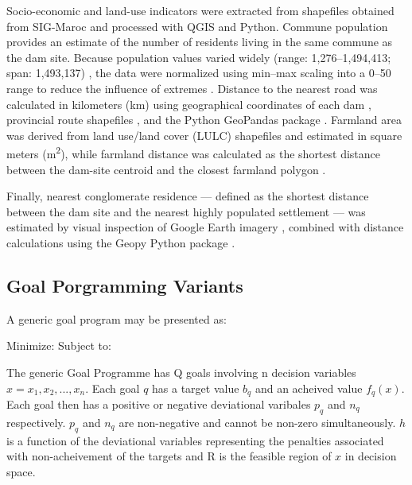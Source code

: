 Socio-economic and land-use indicators were extracted from shapefiles obtained from SIG-Maroc \cite{SIG_Maroc_Shapefiles} and processed with QGIS and Python. Commune population provides an estimate of the number of residents living in the same commune as the dam site. Because population values varied widely (range: 1,276–1,494,413; span: 1,493,137) \cite{Ersoy2022}, the data were normalized using min–max scaling into a 0–50 range to reduce the influence of extremes \cite{Kosareva2018,population_normalization_py}. Distance to the nearest road was calculated in kilometers (km) using geographical coordinates of each dam \cite{Coordinates2025}, provincial route shapefiles \cite{routes2025}, and the Python GeoPandas package \cite{roadsCode2025}. Farmland area was derived from land use/land cover (LULC) shapefiles \cite{LULC_MegaArchive} and estimated in square meters (m\textsuperscript{2}), while farmland distance was calculated as the shortest distance between the dam-site centroid and the closest farmland polygon \cite{farmlandAreaCode2025}.

Finally, nearest conglomerate residence — defined as the shortest distance between the dam site and the nearest highly populated settlement — was estimated by visual inspection of Google Earth imagery \cite{congolerateResidenceGearth2025}, combined with distance calculations using the Geopy Python package \cite{congloResidence2025}.



\subsection{Goal Porgramming Variants}

A generic goal program \cite{jones2010} may be presented as:

Minimize:
            \EqGGPMinFunctionOne
Subject to:
            \EqGGPMinFunctionSubTwo
            \EqGGPMinFunctionSubThree
            \EqGGPMinFunctionSubFour    

The generic Goal Programme has Q goals involving n decision variables $x = x_1,x_2, ...,x_n.$ Each goal $q$ has a target value $b_q$ and an acheived value $f_q(x)$. Each goal then has a positive or negative deviational varibales $p_q$ and $n_q$ respectively. $p_q$ and $n_q$ are non-negative and cannot be non-zero simultaneously. $h$ is a function of the deviational variables representing the penalties associated with non-acheivement of the targets and R is the feasible region of $x$ in decision space.

